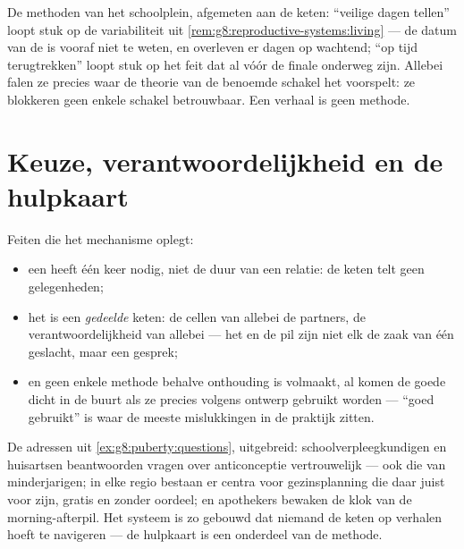 \begin{remark}\label{rem:g8:contraception:notwork}
De methoden van het schoolplein, afgemeten aan de keten: ``veilige dagen
tellen'' loopt stuk op de variabiliteit uit
\cref{rem:g8:reproductive-systems:living} --- de datum van de  is
vooraf niet te weten, en  overleven er dagen op wachtend;
``op tijd terugtrekken'' loopt stuk op het feit dat  al vóór de
finale onderweg zijn. Allebei falen ze precies waar de theorie van de
benoemde schakel het voorspelt: ze blokkeren geen enkele schakel
betrouwbaar. Een verhaal is geen methode.
\end{remark}

\section{Keuze, verantwoordelijkheid en de hulpkaart}

\begin{proposition}\label{prop:g8:contraception:choice}
Feiten die het mechanisme oplegt:
\begin{itemize}
  \item een  heeft één keer nodig, niet de duur van een
        relatie: de keten telt geen gelegenheden;
  \item het is een \emph{gedeelde} keten: de cellen van allebei de
        partners, de verantwoordelijkheid van allebei --- het  en
        de pil zijn niet elk de zaak van één geslacht, maar een gesprek;
  \item en geen enkele methode behalve onthouding is volmaakt, al komen
        de goede dicht in de buurt als ze precies volgens ontwerp gebruikt
        worden --- ``goed gebruikt'' is waar de meeste mislukkingen in de
        praktijk zitten.
\end{itemize}
\end{proposition}
\admitted

\begin{example}[De hulpkaart]\label{ex:g8:contraception:help}
De adressen uit \cref{ex:g8:puberty:questions}, uitgebreid:
schoolverpleegkundigen en huisartsen beantwoorden vragen over
anticonceptie vertrouwelijk --- ook die van minderjarigen; in elke regio
bestaan er centra voor gezinsplanning die daar juist voor zijn, gratis en
zonder oordeel; en apothekers bewaken de klok van de morning-afterpil. Het
systeem is zo gebouwd dat niemand de keten op verhalen hoeft te navigeren
--- de hulpkaart is een onderdeel van de methode.
\end{example}

